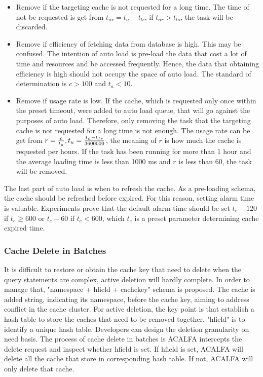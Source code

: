 \documentclass{singlecol-new}
\theoremstyle{TH}{
\newtheorem{lemma}{Lemma}
\newtheorem{theorem}[lemma]{Theorem}
\newtheorem{corrolary}[lemma]{Corrolary}
\newtheorem{conjecture}[lemma]{Conjecture}
\newtheorem{proposition}[lemma]{Proposition}
\newtheorem{claim}[lemma]{Claim}
\newtheorem{stheorem}[lemma]{Wrong Theorem}
}
\theoremstyle{THrm}{
\newtheorem{definition}{Definition}[section]
\newtheorem{question}{Question}[section]
\newtheorem{remark}{Remark}
\newtheorem{scheme}{Scheme}
}
\theoremstyle{THhit}{
\newtheorem{case}{Case}[section]
}
\begin{document}
\begin{itemize}
    \item Remove if the targeting cache is not requested for a long time. The time of not be requested is get from $t_{nr} = t_n - t_{lr}$, if $t_{nr} > t_{to}$, the task will be discarded.
    \item Remove if efficiency of fetching data from database is high. This may be confused. The intention of auto load is pre-load the data that cost a lot of time and resources and be accessed frequently. Hence, the data that obtaining efficiency is high should not occupy the space of auto load. The standard of determination is $c > 100$ and $t_a < 10$.
    \item Remove if usage rate is low. If the cache, which is requested only once within the preset timeout, were added to auto load queue, that will go against the purposes of auto load. Therefore, only removing the task that the targeting cache is not requested for a long time is not enough. The usage rate can be get from $r = \frac{c}{t_u}, t_u = {{t_n - t_{fr}}\over{3600000}}$, the meaning of $r$ is how much the cache is requested per hours. If the task has been running for more than 1 hour and the average loading time is less than 1000 ms and $r$ is less than 60, the task will be removed.
\end{itemize}{}

The last part of auto load is when to refresh the cache. As a pre-loading schema, the cache should be refreshed before expired. For this reason, setting alarm time is valuable. Experiments prove that the default alarm time should be set $t_e - 120$ if $t_e \geq 600$ or $t_e - 60$ if $t_e < 600$, which $t_e$ is a preset parameter determining cache expired time.


\subsubsection{Cache Delete in Batches}
It is difficult to restore or obtain the cache key that need to delete when the query statements are complex, active deletion will hardly complete. In order to manage that, "namespace + hfield + cachekey" schema is proposed. The cache is added string, indicating its namespace, before the cache key, aiming to address conflict in the cache cluster. For active deletion, the key point is that establish a hash table to store the caches that need to be removed together. "hfield" is to identify a unique hash table. Developers can design the deletion granularity on need basis. The process of cache delete in batches is ACALFA intercepts the delete request and inspect whether hfield is set. If hfield is set, ACALFA will delete all the cache that store in corresponding hash table. If not, ACALFA will only delete that cache.
\end{document}
